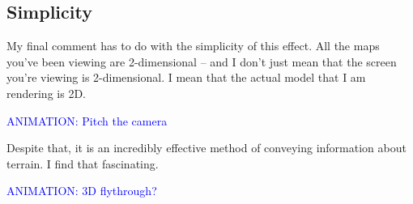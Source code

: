 \documentclass{article}
\newcommand\animation[1]{\textcolor{blue}{ANIMATION: #1}}
\begin{document}
\subsection{Simplicity}

My final comment has to do with the simplicity of this effect.
All the maps you've been viewing are 2-dimensional -- and I don't just mean that the screen you're viewing is 2-dimensional.
I mean that the actual model that I am rendering is 2D.

\animation{Pitch the camera}

Despite that, it is an incredibly effective method of conveying information about terrain.
I find that fascinating.

\animation{3D flythrough?}
\end{document}
